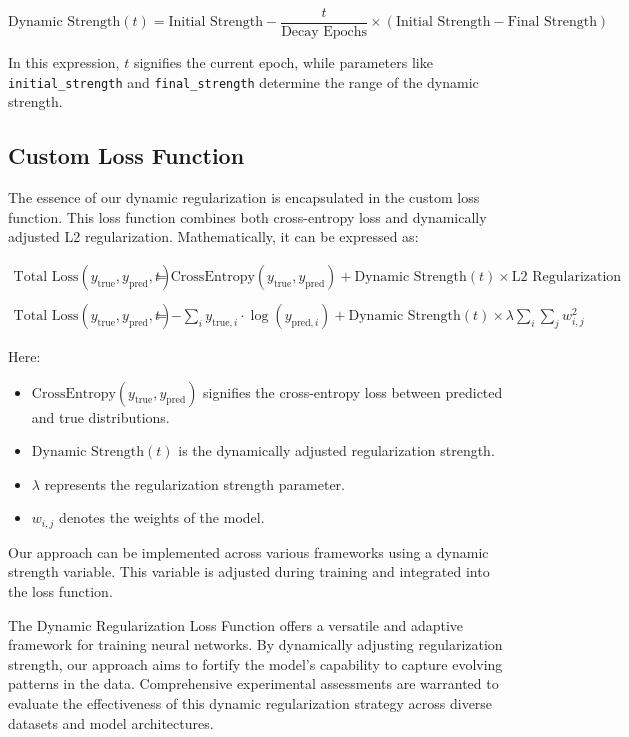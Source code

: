 \documentclass{article}
\begin{document}
\[
\text{Dynamic Strength}(t) = \text{Initial Strength} - \frac{t}{\text{Decay Epochs}} \times (\text{Initial Strength} - \text{Final Strength})
\]

In this expression, \( t \) signifies the current epoch, while parameters like \texttt{initial\_strength} and \texttt{final\_strength} determine the range of the dynamic strength.

\subsection{Custom Loss Function}

The essence of our dynamic regularization is encapsulated in the custom loss function. This loss function combines both cross-entropy loss and dynamically adjusted L2 regularization. Mathematically, it can be expressed as:

\begin{align*}
\text{Total Loss}(y_{\text{true}}, y_{\text{pred}}, t) &= \text{CrossEntropy}(y_{\text{true}}, y_{\text{pred}}) + \text{Dynamic Strength}(t) \times \text{L2 Regularization} \\
\end{align*}
\begin{align*}
\text{Total Loss}(y_{\text{true}}, y_{\text{pred}}, t) &= - \sum_i y_{\text{true},i} \cdot \log(y_{\text{pred},i}) + \text{Dynamic Strength}(t) \times \lambda \sum_i \sum_j w_{i,j}^2
\end{align*}

Here:
\begin{itemize}
  \item $\text{CrossEntropy}(y_{\text{true}}, y_{\text{pred}})$ signifies the cross-entropy loss between predicted and true distributions.
  \item $\text{Dynamic Strength}(t)$ is the dynamically adjusted regularization strength.
  \item $\lambda$ represents the regularization strength parameter.
  \item $w_{i,j}$ denotes the weights of the model.
\end{itemize}


Our approach can be implemented across various frameworks using a dynamic strength variable. This variable is adjusted during training and integrated into the loss function.

The Dynamic Regularization Loss Function offers a versatile and adaptive framework for training neural networks. By dynamically adjusting regularization strength, our approach aims to fortify the model's capability to capture evolving patterns in the data. Comprehensive experimental assessments are warranted to evaluate the effectiveness of this dynamic regularization strategy across diverse datasets and model architectures.
\end{document}

